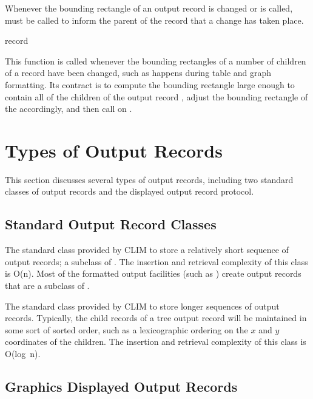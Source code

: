 Whenever the bounding rectangle of an output record is changed or
 is called, 
must be called to inform the parent of the record that a change has taken place.

 {record}

This function is called whenever the bounding rectangles of a number of children
of a record have been changed, such as happens during table and graph
formatting.  Its contract is to compute the bounding rectangle large enough to
contain all of the children of the output record , adjust the
bounding rectangle of the   accordingly, and
then call  on .


\section {Types of Output Records}

This section discusses several types of output records, including two standard
classes of output records and the displayed output record protocol.

\subsection {Standard Output Record Classes}


The standard class provided by CLIM to store a relatively short sequence of
output records; a subclass of .  The insertion and retrieval
complexity of this class is O(n).  Most of the formatted output facilities (such
as ) create output records that are a subclass of
.


The standard class provided by CLIM to store longer sequences of output records.
Typically, the child records of a tree output record will be maintained in some
sort of sorted order, such as a lexicographic ordering on the $x$ and $y$
coordinates of the children.  The insertion and retrieval complexity of this
class is O(log~n).


\subsection {Graphics Displayed Output Records}

